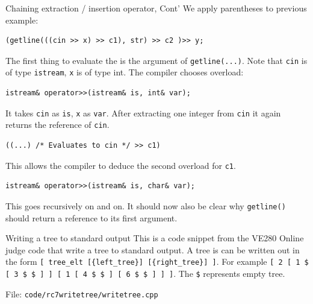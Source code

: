 \begin{frame}[fragile]{Chaining extraction / insertion operator, Cont'}
We apply parentheses to previous example:
\begin{verbatim}
(getline(((cin >> x) >> c1), str) >> c2 )>> y;
\end{verbatim}
The first thing to evaluate the is the argument of \texttt{getline(...)}. Note that \texttt{cin} is of type \texttt{istream}, \texttt{x} is of type {int}. The compiler chooses overload:
\begin{verbatim}
istream& operator>>(istream& is, int& var);  
\end{verbatim}
It takes \texttt{cin} as \texttt{is}, \texttt{x} as \texttt{var}. After extracting one integer from \texttt{cin} it again returns the reference of \texttt{cin}. 
\begin{verbatim}
((...) /* Evaluates to cin */ >> c1)
\end{verbatim}
This allows the compiler to deduce the second overload for \texttt{c1}. 
\begin{verbatim}
istream& operator>>(istream& is, char& var);  
\end{verbatim}
This goes recursively on and on. It should now also be clear why \texttt{getline()} should return a reference to its first argument. 
\end{frame}

\begin{frame}{Writing a tree to standard output}
This is a code snippet from the VE280 Online judge code that write a tree to standard output.  A tree is can be written out in the form \texttt{[ tree\_elt [\{left\_tree\}] [\{right\_tree\}] ]}. For example \texttt{[ 2 [ 1 \$ [ 3 \$ \$ ] ] [ 1 [ 4 \$ \$ ] [ 6 \$ \$ ] ] ]}. The \texttt{\$} represents empty tree.

File: \texttt{code/rc7writetree/writetree.cpp}
\inputminted[]{c++}{code/rc7writetree/writetree.cpp}
\end{frame}



